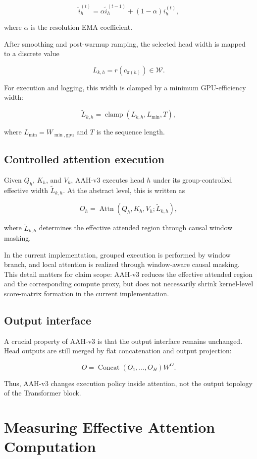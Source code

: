 \documentclass[11pt]{article}
\begin{document}
\[
\tilde i_h^{(t)} = \alpha \tilde i_h^{(t-1)} + (1-\alpha) i_h^{(t)},
\]

where $\alpha$ is the resolution EMA coefficient.

After smoothing and post-warmup ramping, the selected head width is mapped to a discrete value

\[
L_{k,h} = r(c_{\pi(h)}) \in \mathcal W.
\]

For execution and logging, this width is clamped by a minimum GPU-efficiency width:

\[
\tilde L_{k,h} = \operatorname{clamp}(L_{k,h}, L_{\min}, T),
\]

where $L_{\min}=W_{\min,\text{gpu}}$ and $T$ is the sequence length.

\subsection{Controlled attention execution}

Given $Q_h$, $K_h$, and $V_h$, AAH-v3 executes head $h$ under its group-controlled effective width $\tilde L_{k,h}$. At the abstract level, this is written as

\[
O_h = \operatorname{Attn}(Q_h, K_h, V_h;\tilde L_{k,h}),
\]

where $\tilde L_{k,h}$ determines the effective attended region through causal window masking.

In the current implementation, grouped execution is performed by window branch, and local attention is realized through window-aware causal masking. This detail matters for claim scope: AAH-v3 reduces the effective attended region and the corresponding compute proxy, but does not necessarily shrink kernel-level score-matrix formation in the current implementation.

\subsection{Output interface}

A crucial property of AAH-v3 is that the output interface remains unchanged. Head outputs are still merged by flat concatenation and output projection:

\[
O = \operatorname{Concat}(O_1,\dots,O_H)W^O.
\]

Thus, AAH-v3 changes execution policy inside attention, not the output topology of the Transformer block.



\section{Measuring Effective Attention Computation}
\end{document}

